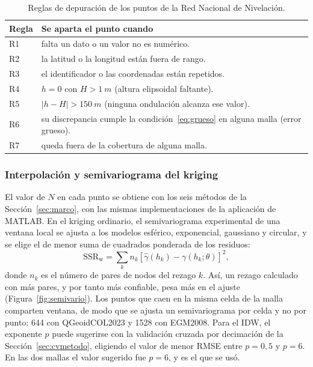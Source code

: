 \documentclass[11pt,letterpaper]{article}
\begin{document}
\begin{table}[H]
\centering
\caption{Reglas de depuración de los puntos de la Red Nacional de Nivelación.}
\label{tab:depuracion}
\small
\renewcommand{\arraystretch}{1.15}
\begin{tabular}{@{}lp{12.4cm}@{}}
\toprule
Regla & Se aparta el punto cuando \\
\midrule
R1 & falta un dato o un valor no es numérico. \\
R2 & la latitud o la longitud están fuera de rango. \\
R3 & el identificador o las coordenadas están repetidos. \\
R4 & $h=0$ con $H>\SI{1}{m}$ (altura elipsoidal faltante). \\
R5 & $|h-H|>\SI{150}{m}$ (ninguna ondulación alcanza ese valor). \\
R6 & su discrepancia cumple la condición~\eqref{eq:grueso} en alguna malla (error grueso). \\
R7 & queda fuera de la cobertura de alguna malla. \\
\bottomrule
\end{tabular}
\end{table}

\subsubsection{Interpolación y semivariograma del kriging}
El valor de $N$ en cada punto se obtiene con los seis métodos de la Sección~\ref{sec:marco}, con
las mismas implementaciones de la aplicación de MATLAB. En el kriging ordinario, el
semivariograma experimental de una ventana local se ajusta a los modelos esférico,
exponencial, gaussiano y circular, y se elige el de menor suma de cuadrados ponderada de los
residuos:
\begin{equation}
\mathrm{SSR_w}=\sum_{k} n_k\left[\hat\gamma(h_k)-\gamma(h_k;\theta)\right]^2,
\label{eq:ssrw}
\end{equation}
donde $n_k$ es el número de pares de nodos del rezago $k$. Así, un rezago calculado con más
pares, y por tanto más confiable, pesa más en el ajuste (Figura~\ref{fig:semivario}). Los
puntos que caen en la misma celda de la malla comparten ventana, de modo que se ajusta un
semivariograma por celda y no por punto: 
644 con QGeoidCOL2023 y 
1528 con EGM2008.
Para el IDW, el exponente $p$ puede sugerirse con la validación cruzada por decimación de la
Sección~\ref{sec:cvmetodo}, eligiendo el valor de menor RMSE entre $p=0{,}5$ y $p=6$. En
las dos mallas el valor sugerido fue $p=6$, y es el que se usó.
\end{document}
